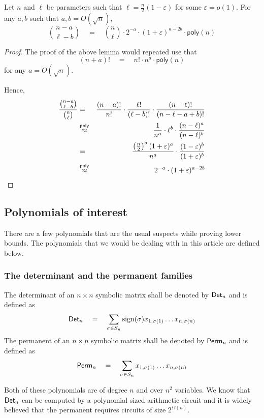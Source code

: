 \documentclass[12pt]{report}
\newcommand{\poly}{\mathsf{poly}}
\renewcommand{\epsilon}{\varepsilon}
\begin{document}
\begin{lemma}\label{lem:binom-approx}
Let $n$ and $\ell$ be parameters such that $\ell = \frac{n}{2}(1 - \epsilon)$ for some $\epsilon = o(1)$. For any $a, b$ such that $a,b = O(\sqrt{n})$, 
\[
\binom{n - a}{\ell - b} \quad = \quad \binom{n}{\ell} \cdot 2^{-a} \cdot (1+\epsilon)^{a-2b} \cdot \poly(n)
\]
\end{lemma}
\begin{proof}
The proof of the above lemma would repeated use \cite[Lemma 6]{gkks13} that 
\[
(n+a)! \quad = \quad n! \cdot n^{a} \cdot \poly(n)
\]
for any $a = O(\sqrt{n})$. 

Hence,
\begin{eqnarray*}
\frac{\binom{n-a}{\ell -b}}{\binom{n}{\ell}} & = & \frac{(n-a)!}{n!} \cdot \frac{\ell!}{(\ell -b)!}\cdot \frac{(n-\ell)!}{(n-\ell-a+b)!}\\
& \stackrel{\poly}{\approx}& \frac{1}{n^a} \cdot \ell^b \cdot \frac{(n-\ell)^a}{(n-\ell)^b}\\
& = & \frac{\inparen{\frac{n}{2}}^a(1 +\epsilon)^a}{n^a} \cdot \frac{(1-\epsilon)^{b}}{(1+\epsilon)^b}\\
& \stackrel{\poly}{\approx} & 2^{-a} \cdot (1+\epsilon)^{a - 2b}
\end{eqnarray*}
\end{proof}

\subsection{Polynomials of interest}

There are a few polynomials that are the usual suspects while proving lower bounds. The polynomials that we would be dealing with in this article are defined below. 

\subsubsection*{The determinant and the permanent families}

The determinant of an $n\times n$ symbolic matrix shall be denoted by $\mathsf{Det}_n$ and is defined as
\[
\mathsf{Det}_n \quad = \quad \sum_{\sigma \in S_n} \text{sign}(\sigma) x_{1,\sigma(1)}\dots x_{n,\sigma(n)}
\]
The permanent of an $n\times n$ symbolic matrix shall be denoted by $\mathsf{Perm}_n$ and is defined as
\[
\mathsf{Perm}_n \quad = \quad \sum_{\sigma \in S_n}x_{1,\sigma(1)}\dots x_{n,\sigma(n)}
\]

Both of these polynomials are of degree $n$ and over $n^2$ variables. We know that $\mathsf{Det}_n$ can be computed by a polynomial sized arithmetic circuit and it is widely believed that the permanent requires circuits of size $2^{\Omega(n)}$. 
\end{document}

